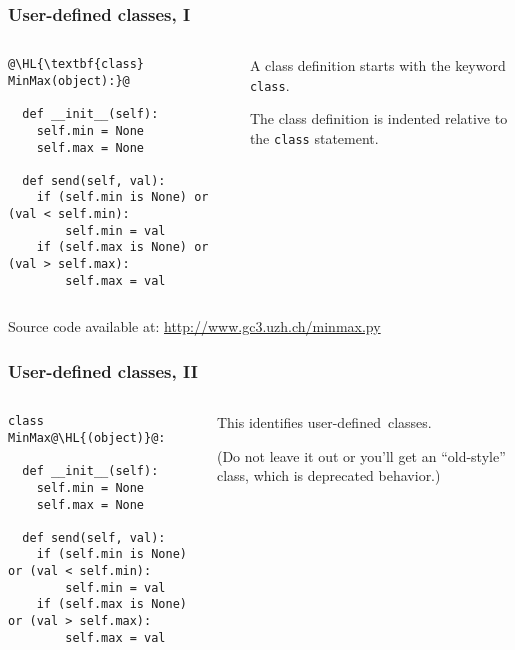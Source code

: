 \documentclass[english,serif,mathserif,xcolor=pdftex,dvipsnames,table]{beamer}
\begin{document}
\begin{frame}[fragile]
  \frametitle{User-defined classes, I}
  \begin{columns}[t]
    \begin{column}{0.5\textwidth}
\begin{lstlisting}
@\HL{\textbf{class} MinMax(object):}@

  def __init__(self):
    self.min = None
    self.max = None

  def send(self, val):
    if (self.min is None) or (val < self.min):
        self.min = val
    if (self.max is None) or (val > self.max):
        self.max = val
\end{lstlisting}
    \end{column}
    \begin{column}{0.5\textwidth}
      \raggedleft 
      A class definition starts with the keyword \texttt{class}.

      The class definition is indented relative to the \texttt{class}
      statement.
    \end{column}
  \end{columns}

  \+
  {\scriptsize Source code available at:
    \url{http://www.gc3.uzh.ch/minmax.py}}
\end{frame}


\begin{frame}[fragile]
  \frametitle{User-defined classes, II}
  \begin{columns}[t]
    \begin{column}{0.5\textwidth}
\begin{lstlisting}
class MinMax@\HL{(object)}@:

  def __init__(self):
    self.min = None
    self.max = None

  def send(self, val):
    if (self.min is None) or (val < self.min):
        self.min = val
    if (self.max is None) or (val > self.max):
        self.max = val
\end{lstlisting}
    \end{column}
    \begin{column}{0.5\textwidth}
      \raggedleft 
      This identifies user-defined~classes.

      \+
      (Do not leave it out or you'll get an ``old-style'' class, which
      is deprecated behavior.)
    \end{column}
  \end{columns}
\end{frame}
\end{document}
